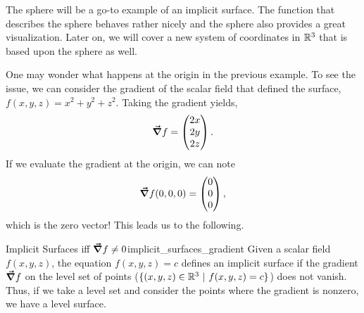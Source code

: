                 The sphere will be a go-to example of an implicit surface.  The function that describes the sphere behaves rather nicely and the sphere also provides a great visualization.  Later on, we will cover a new system of coordinates in $\mathbb{R}^3$ that is based upon the sphere as well.

                One may wonder what happens at the origin in the previous example.  To see the issue, we can consider the gradient of the scalar field that defined the surface, $f(x,y,z) = x^2+y^2+z^2$.  Taking the gradient yields,
                \[
                \boldsymbol{\vec{\nabla}} f = \begin{pmatrix} 2x \\ 2y \\ 2z \end{pmatrix}.
                \]
                If we evaluate the gradient at the origin, we can note
                \[
                \boldsymbol{\vec{\nabla}} f(0,0,0) = \begin{pmatrix} 0 \\ 0 \\ 0 \end{pmatrix},
                \]
                which is the zero vector!  This leads us to the following.

                \begin{thm}{Implicit Surfaces iff $\boldsymbol{\vec{\nabla}} f \neq 0$}{implicit_surfaces_gradient}
                	Given a scalar field $f(x,y,z)$, the equation $f(x,y,z)=c$ defines an implicit surface if the gradient $\boldsymbol{\vec{\nabla}} f$ on the level set of points ($\{(x,y,z) \in \mathbb{R}^3 ~\vert~ f(x,y,z)=c\}$) does not vanish. Thus, if we take a level set and consider the points where the gradient is nonzero, we have a level surface.
                \end{thm}

